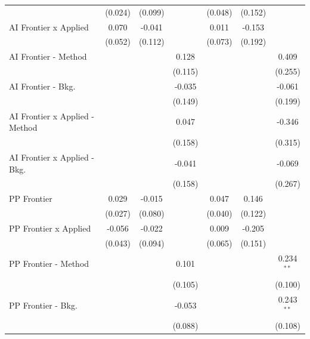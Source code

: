 \begin{tabular}{lcccccc}
                                  & (0.024) & (0.099) &               & (0.048) & (0.152) &   \\   
   AI Frontier x Applied          & 0.070   & -0.041  &               & 0.011   & -0.153  &   \\   
                                  & (0.052) & (0.112) &               & (0.073) & (0.192) &   \\   
   AI Frontier - Method           &         &         & 0.128         &         &         & 0.409\\   
                                  &         &         & (0.115)       &         &         & (0.255)\\   
   AI Frontier - Bkg.             &         &         & -0.035        &         &         & -0.061\\   
                                  &         &         & (0.149)       &         &         & (0.199)\\   
   AI Frontier x Applied - Method &         &         & 0.047         &         &         & -0.346\\   
                                  &         &         & (0.158)       &         &         & (0.315)\\   
   AI Frontier x Applied - Bkg.   &         &         & -0.041        &         &         & -0.069\\   
                                  &         &         & (0.158)       &         &         & (0.267)\\   
   PP Frontier                    & 0.029   & -0.015  &               & 0.047   & 0.146   &   \\   
                                  & (0.027) & (0.080) &               & (0.040) & (0.122) &   \\   
   PP Frontier x Applied          & -0.056  & -0.022  &               & 0.009   & -0.205  &   \\   
                                  & (0.043) & (0.094) &               & (0.065) & (0.151) &   \\   
   PP Frontier - Method           &         &         & 0.101         &         &         & 0.234$^{**}$\\   
                                  &         &         & (0.105)       &         &         & (0.100)\\   
   PP Frontier - Bkg.             &         &         & -0.053        &         &         & 0.243$^{**}$\\   
                                  &         &         & (0.088)       &         &         & (0.108)\\   

\end{tabular}
